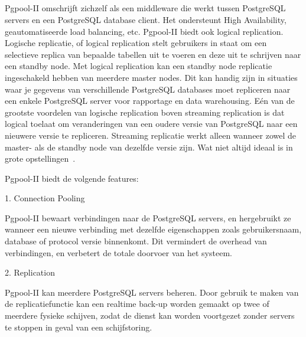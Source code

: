 
\subsection{}
\label{subsec:Pgpool-II}

Pgpool-II omschrijft zichzelf als een middleware die werkt tussen PostgreSQL servers en een PostgreSQL database client. Het ondersteunt High Availability, geautomatiseerde load balancing, etc. Pgpool-II biedt ook logical replication. Logische replicatie, of logical replication stelt gebruikers in staat om een selectieve replica van bepaalde tabellen uit te voeren en deze uit te schrijven naar een standby node. Met logical replication kan een standby node replicatie ingeschakeld hebben van meerdere master nodes. Dit kan handig zijn in situaties waar je gegevens van verschillende PostgreSQL databases moet repliceren naar een enkele PostgreSQL server voor rapportage en data warehousing. Eén van de grootste voordelen van logische replication boven streaming replication is dat logical toelaat om veranderingen van een oudere versie van PostgreSQL naar een nieuwere versie te repliceren. Streaming replicatie werkt alleen wanneer zowel de master- als de standby node van dezelfde versie zijn. Wat niet altijd ideaal is in grote opstellingen~\autocite{Vallarapu2019}. %

Pgpool-II biedt de volgende features:

1. Connection Pooling

Pgpool-II bewaart verbindingen naar de PostgreSQL servers, en hergebruikt ze wanneer een nieuwe verbinding met dezelfde eigenschappen zoals gebruikersnaam, database of protocol versie binnenkomt. Dit vermindert de overhead van verbindingen, en verbetert de totale doorvoer van het systeem.

2. Replication

Pgpool-II kan meerdere PostgreSQL servers beheren. Door gebruik te maken van de replicatiefunctie kan een realtime back-up worden gemaakt op twee of meerdere fysieke schijven, zodat de dienst kan worden voortgezet zonder servers te stoppen in geval van een schijfstoring.

